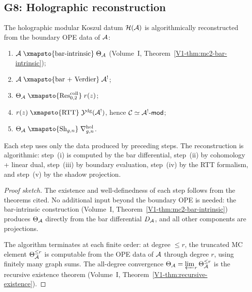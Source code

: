 \subsection{G8: Holographic reconstruction}

\begin{theorem}
The holographic modular Koszul datum $\mathcal{H}(\mathcal{A})$ is algorithmically
reconstructed from the boundary OPE data of $\mathcal{A}$:
\begin{enumerate}[label=\textup{(\roman*)}]
\item $\cA \;\xmapsto{\text{bar-intrinsic}}\; \Theta_\cA$
 (Volume~I, Theorem~\ref*{V1-thm:mc2-bar-intrinsic});
\item $\cA \;\xmapsto{\text{bar + Verdier}}\; \cA^!$;
\item $\Theta_\cA \;\xmapsto{\Res^{\mathrm{coll}}_{0,2}}\; r(z)$;
\item $r(z) \;\xmapsto{\text{RTT}}\; \Ydg(\cA^!)$, hence
 $\mathcal{C} \simeq \mathcal{A}^!\text{-}\mathsf{mod}$;
\item $\Theta_\cA \;\xmapsto{\operatorname{Sh}_{g,n}}\;
 \nabla^{\mathrm{hol}}_{g,n}$.
\end{enumerate}
Each step uses only the data produced by preceding steps.
The reconstruction is algorithmic: step~(i) is computed by the
bar differential, step~(ii) by cohomology + linear dual, step~(iii)
by boundary evaluation, step~(iv) by the RTT formalism, and
step~(v) by the shadow projection.
\end{theorem}

\begin{proof}[Proof sketch]
The existence and well-definedness of each step follows from the
theorems cited. No additional input beyond
the boundary OPE is needed: the bar-intrinsic construction
(Volume~I, Theorem~\ref*{V1-thm:mc2-bar-intrinsic}) produces $\Theta_{\mathcal{A}}$
directly from the bar differential $D_{\mathcal{A}}$, and all other components
are projections.

The algorithm terminates at each finite order: at degree $\le r$, the
truncated MC element $\Theta_{\mathcal{A}}^{\le r}$ is computable from the OPE
data of $\mathcal{A}$ through degree $r$, using finitely many graph sums.
The all-degree convergence $\Theta_{\mathcal{A}} = \varprojlim_r \Theta_{\mathcal{A}}^{\le r}$
is the recursive existence theorem
(Volume~I, Theorem~\ref{V1-thm:recursive-existence}).
\end{proof}


